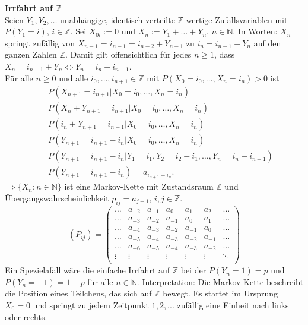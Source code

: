 \documentclass[a4paper,12pt]{article}
\begin{document}
\begin{tcolorbox}[breakable, colframe=blue, colback=white, title=Beispiel 3]
	\textbf{Irrfahrt auf $\mathbb{Z}$}\\

	Seien $Y_1, Y_2, \dots$ unabhängige, identisch verteilte $\mathbb{Z}$-wertige Zufallsvariablen mit $P(Y_1 = i)$, $i \in \mathbb{Z}$.
	Sei $X_{0i} := 0$ und $X_n := Y_1 + \dots + Y_n$, $n \in \mathbb{N}$.
	In Worten: $X_n$ springt zufällig von $X_{n-1} = i_{n-1} = i_{n-2} + Y_{n-1}$ zu $i_n = i_{n-1} + Y_n$ auf den ganzen Zahlen $\mathbb{Z}$.
	Damit gilt offensichtlich für jedes $n \geq 1$, dass $X_n = i_{n-1} + Y_{n} \Leftrightarrow Y_n = i_n - i_{n-1}$.\\
	Für alle $n \geq 0$ und alle $i_0, \dots, i_{n+1} \in \mathbb{Z}$ mit $P(X_0 = i_0, \dots, X_n = i_n) > 0$ ist
	\begin{align*}
		  & P(X_{n+1} = i_{n+1} | X_0 = i_0, \dots, X_n = i_n)                                  \\
		= & P(X_n + Y_{n+1} = i_{n+1} | X_0 = i_0, \dots, X_n = i_n)                            \\
		= & P(i_n + Y_{n+1} = i_{n+1} | X_0 = i_0, \dots, X_n = i_n)                            \\
		= & P(Y_{n+1} = i_{n+1} - i_n | X_0 = i_0, \dots, X_n = i_n)                            \\
		= & P(Y_{n+1} = i_{n+1} - i_n | Y_1 = i_1, Y_2 = i_2 - i_1, \dots, Y_n = i_n - i_{n-1}) \\
		= & P(Y_{n+1} = i_{n+1} - i_n) = a_{i_{n+1} - i_n}.
	\end{align*}
	$\Rightarrow \{X_n: n\in \mathbb{N}\}$ ist eine Markov-Kette mit Zustandsraum $\mathbb{Z}$ und Übergangswahrscheinlichkeit $p_{ij} =a_{j-1}$, $i,j \in \mathbb{Z}$.
	$$
		\left( P_{ij} \right) =
		\begin{pmatrix}
			\dots  & a_{-2} & a_{-1} & a_0    & a_1    & a_2    & \dots  \\
			\dots  & a_{-3} & a_{-2} & a_{-1} & a_0    & a_1    & \dots  \\
			\dots  & a_{-4} & a_{-3} & a_{-2} & a_{-1} & a_0    & \dots  \\
			\dots  & a_{-5} & a_{-4} & a_{-3} & a_{-2} & a_{-1} & \dots  \\
			\dots  & a_{-6} & a_{-5} & a_{-4} & a_{-3} & a_{-2} & \dots  \\
			\vdots & \vdots & \vdots & \vdots & \vdots & \vdots & \ddots \\
		\end{pmatrix}
	$$
	Ein Spezielafall wäre die einfache Irrfahrt auf $\mathbb{Z}$ bei der $P(Y_n =1) = p$ und $P(Y_n = -1) = 1-p$ für alle $n \in \mathbb{N}$.
	Interpretation: Die Markov-Kette beschreibt die Position eines Teilchens, das sich auf $\mathbb{Z}$ bewegt. Es startet im Ursprung $X_0 = 0$ und springt zu jedem Zeitpunkt $1,2, ...$ zufällig eine Einheit nach links oder rechts.
\end{tcolorbox}
\end{document}
